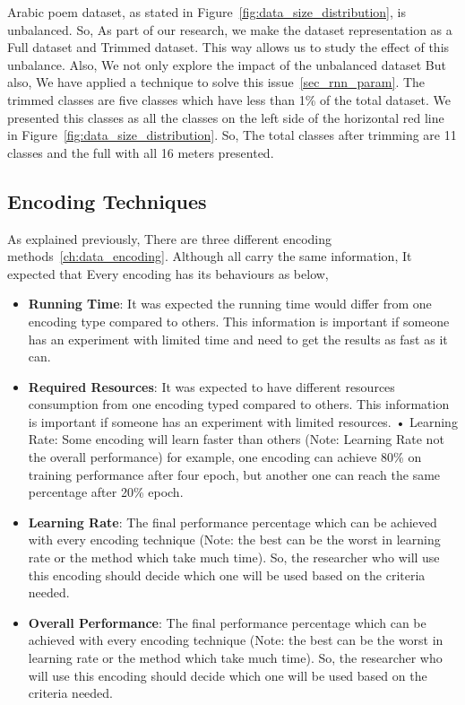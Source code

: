 Arabic poem dataset, as stated in Figure~\ref{fig:data_size_distribution}, is unbalanced. So, As part of our research, we make the dataset representation as a Full dataset and Trimmed dataset. This way allows us to study the effect of this unbalance. Also, We not only explore the impact of the unbalanced dataset But also, We have applied a technique to solve this issue~\ref{sec_rnn_param}. The trimmed classes are five classes which have less than 1\% of the total dataset. We presented this classes as all the classes on the left side of the horizontal red line in Figure~\ref{fig:data_size_distribution}. So, The total classes after trimming are 11 classes and the full with all 16 meters presented.

\subsection{Encoding Techniques}

As explained previously, There are three different encoding methods~\ref{ch:data_encoding}. Although all carry the same information, It expected that Every encoding has its behaviours as below,
\begin{itemize}
\item \textbf{Running Time}: It was expected the running time would differ from one encoding type compared to others. This information is important if someone has an experiment with limited time and need to get the results as fast as it can.
\item \textbf{Required Resources}: It was expected to have different resources consumption from one encoding typed compared to others. This information is important if someone has an experiment with limited resources.
• Learning Rate: Some encoding will learn faster than others (Note: Learning Rate not the overall performance) for example, one encoding can achieve 80\% on training performance after four epoch, but another one can reach the same percentage after 20\% epoch.
\item \textbf{Learning Rate}: The final performance percentage which can be achieved with every encoding technique (Note: the best can be the worst in learning rate or the method which take much time). So, the researcher who will use this encoding should decide which one will be used based on the criteria needed.

\item \textbf{Overall Performance}: The final performance percentage which can be achieved with every encoding technique (Note: the best can be the worst in learning rate or the method which take much time). So, the researcher who will use this encoding should decide which one will be used based on the criteria needed.

  \end{itemize}

